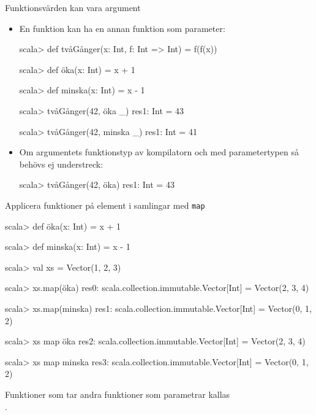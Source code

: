 \begin{Slide}{Funktionsvärden kan vara argument}
\begin{itemize}
\item En funktion kan ha en annan funktion som parameter:
\begin{REPL}
scala> def tvåGånger(x: Int, f: Int => Int) = f(f(x))

scala> def öka(x: Int) = x + 1

scala> def minska(x: Int) = x - 1

scala> tvåGånger(42, öka _)
res1: Int = 43

scala> tvåGånger(42, minska _)
res1: Int = 41
\end{REPL}

\item Om argumentets funktionstyp  av kompilatorn och  med parametertypen så behövs ej understreck: \\ 
\begin{REPL}
scala> tvåGånger(42, öka)
res1: Int = 43
\end{REPL}\end{itemize}
\end{Slide}



\begin{Slide}{Applicera funktioner på element i samlingar med \texttt{map}}\SlideFontSmall
\begin{REPL}
scala> def öka(x: Int) = x + 1

scala> def minska(x: Int) = x - 1

scala> val xs = Vector(1, 2, 3)

scala> xs.map(öka)
res0: scala.collection.immutable.Vector[Int] = Vector(2, 3, 4)

scala> xs.map(minska)
res1: scala.collection.immutable.Vector[Int] = Vector(0, 1, 2)

scala> xs map öka
res2: scala.collection.immutable.Vector[Int] = Vector(2, 3, 4)

scala> xs map minska
res3: scala.collection.immutable.Vector[Int] = Vector(0, 1, 2)
\end{REPL}
Funktioner som tar andra funktioner som parametrar kallas \\ . 
\end{Slide} 




